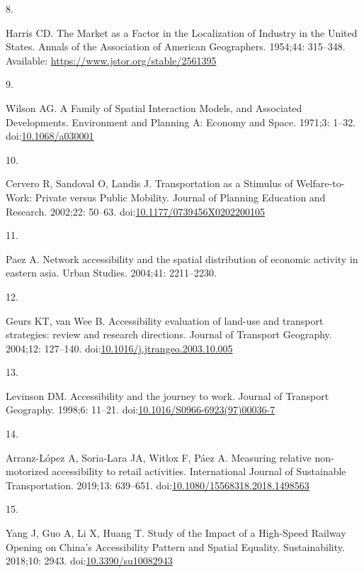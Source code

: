 \documentclass[10pt,letterpaper]{article}
\newlength{\cslhangindent}
\newlength{\csllabelwidth}
\newlength{\cslentryspacingunit} %
\newenvironment{CSLReferences}[2] %
 {%
  \setlength{\parindent}{0pt}
  \ifodd #1
  \let\oldpar\par
  \def\par{\hangindent=\cslhangindent\oldpar}
  \fi
  \setlength{\parskip}{#2\cslentryspacingunit}
 }%
 {}
\newcommand{\CSLLeftMargin}[1]{\parbox[t]{\csllabelwidth}{#1}}
\newcommand{\CSLRightInline}[1]{\parbox[t]{\linewidth - \csllabelwidth}{#1}\break}
\begin{document}
\begin{CSLReferences}{0}{0}
\leavevmode{}%
\CSLLeftMargin{8. }%
\CSLRightInline{Harris CD. The {Market} as a {Factor} in the
{Localization} of {Industry} in the {United} {States}. Annals of the
Association of American Geographers. 1954;44: 315--348. Available:
\url{https://www.jstor.org/stable/2561395}}

\leavevmode{}%
\CSLLeftMargin{9. }%
\CSLRightInline{Wilson AG. A Family of Spatial Interaction Models, and
Associated Developments. Environment and Planning A: Economy and Space.
1971;3: 1--32.
doi:\href{https://doi.org/10.1068/a030001}{10.1068/a030001}}

\leavevmode{}%
\CSLLeftMargin{10. }%
\CSLRightInline{Cervero R, Sandoval O, Landis J. Transportation as a
{Stimulus} of {Welfare}-to-{Work}: {Private} versus {Public} {Mobility}.
Journal of Planning Education and Research. 2002;22: 50--63.
doi:\href{https://doi.org/10.1177/0739456X0202200105}{10.1177/0739456X0202200105}}

\leavevmode{}%
\CSLLeftMargin{11. }%
\CSLRightInline{Paez A. Network accessibility and the spatial
distribution of economic activity in eastern asia. Urban Studies.
2004;41: 2211--2230. }

\leavevmode{}%
\CSLLeftMargin{12. }%
\CSLRightInline{Geurs KT, van Wee B. Accessibility evaluation of
land-use and transport strategies: review and research directions.
Journal of Transport Geography. 2004;12: 127--140.
doi:\href{https://doi.org/10.1016/j.jtrangeo.2003.10.005}{10.1016/j.jtrangeo.2003.10.005}}

\leavevmode{}%
\CSLLeftMargin{13. }%
\CSLRightInline{Levinson DM. Accessibility and the journey to work.
Journal of Transport Geography. 1998;6: 11--21.
doi:\href{https://doi.org/10.1016/S0966-6923(97)00036-7}{10.1016/S0966-6923(97)00036-7}}

\leavevmode{}%
\CSLLeftMargin{14. }%
\CSLRightInline{Arranz-López A, Soria-Lara JA, Witlox F, Páez A.
Measuring relative non-motorized accessibility to retail activities.
International Journal of Sustainable Transportation. 2019;13: 639--651.
doi:\href{https://doi.org/10.1080/15568318.2018.1498563}{10.1080/15568318.2018.1498563}}

\leavevmode{}%
\CSLLeftMargin{15. }%
\CSLRightInline{Yang J, Guo A, Li X, Huang T. Study of the {Impact} of a
{High-Speed Railway Opening} on {China}'s {Accessibility Pattern} and
{Spatial Equality}. Sustainability. 2018;10: 2943.
doi:\href{https://doi.org/10.3390/su10082943}{10.3390/su10082943}}


\end{CSLReferences}
\end{document}
